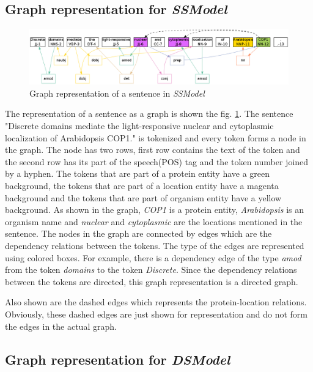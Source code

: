 \subsection{Graph representation for \textit{SSModel}}\label{sec:graphSSModel}

\begin{figure}
\centering
\includegraphics[scale=0.3]{figures/SameSentenceGraph.png}
\caption{Graph representation of a sentence in \textit{SSModel}}\label{fig:SSGraph}
\end{figure}

The representation of a sentence as a graph is shown the fig. \ref{fig:SSGraph}. The sentence "Discrete domains mediate the light-responsive nuclear and cytoplasmic localization of Arabidopsis COP1." is tokenized and every token forms a node in the graph. The node has two rows, first row contains the text of the token and the second row has its part of the speech(POS) tag and the token number joined by a hyphen. The tokens that are part of a protein entity have a green background, the tokens that are part of a location entity have a magenta background and the tokens that are part of organism entity have a yellow  background. As shown in the graph, \textit{COP1} is a protein entity, \textit{Arabidopsis} is an organism name and \textit{nuclear} and \textit{cytoplasmic} are the locations mentioned in the sentence. The nodes in the graph are connected by edges which are the dependency
 relations between the tokens. The type of the edges are represented using colored boxes. For example, there is a dependency edge of the type \textit{amod} from the token \textit{domains}  to  the token \textit{Discrete}. Since the dependency relations between the tokens are directed, this graph representation is a directed graph. 

Also shown are the dashed edges which represents the protein-location relations. Obviously, these dashed edges are just shown for representation and do not form the edges in the actual graph.

\subsection{Graph representation for \textit{DSModel}}\label{sec:graphDSModel}

